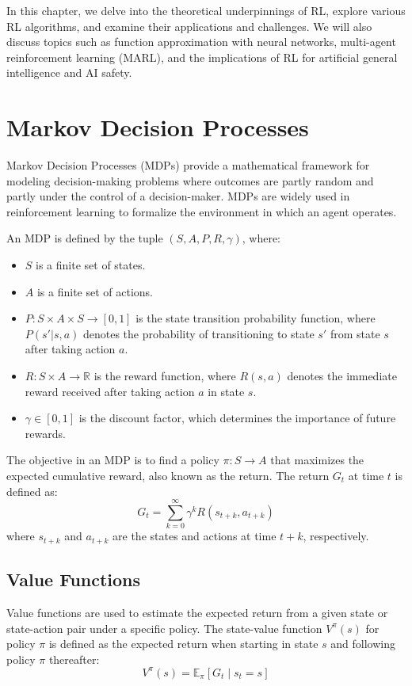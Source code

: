 In this chapter, we delve into the theoretical underpinnings of \gls{RL}, explore various \gls{RL} algorithms, and examine their applications and challenges.
We will also discuss topics such as function approximation with neural networks, multi-agent reinforcement learning (\gls{MARL}), and the implications of \gls{RL} for artificial general intelligence and AI safety.

\section{Markov Decision Processes}

Markov Decision Processes (MDPs) provide a mathematical framework for modeling decision-making problems where outcomes are partly random and partly under the control of a decision-maker. MDPs are widely used in reinforcement learning to formalize the environment in which an agent operates.

An MDP is defined by the tuple $(S, A, P, R, \gamma)$, where:
\begin{itemize}
    \item $S$ is a finite set of states.
    \item $A$ is a finite set of actions.
    \item $P: S \times A \times S \rightarrow [0,1]$ is the state transition probability function, where $P(s'|s,a)$ denotes the probability of transitioning to state $s'$ from state $s$ after taking action $a$.
    \item $R: S \times A \rightarrow \mathbb{R}$ is the reward function, where $R(s,a)$ denotes the immediate reward received after taking action $a$ in state $s$.
    \item $\gamma \in [0,1]$ is the discount factor, which determines the importance of future rewards.
\end{itemize}

The objective in an MDP is to find a policy $\pi: S \rightarrow A$ that maximizes the expected cumulative reward, also known as the return. The return $G_t$ at time $t$ is defined as:
\[
G_t = \sum_{k=0}^{\infty} \gamma^k R(s_{t+k}, a_{t+k})
\]
where $s_{t+k}$ and $a_{t+k}$ are the states and actions at time $t+k$, respectively.

\subsection{Value Functions}

Value functions are used to estimate the expected return from a given state or state-action pair under a specific policy. The state-value function $V^{\pi}(s)$ for policy $\pi$ is defined as the expected return when starting in state $s$ and following policy $\pi$ thereafter:
\[
V^{\pi}(s) = \mathbb{E}_{\pi} \left[ G_t \mid s_t = s \right]
\]

